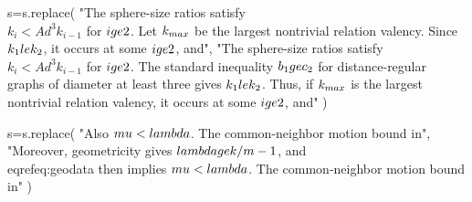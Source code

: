 s=s.replace(
"The sphere-size ratios satisfy\n\\[\n \\frac{k}{c_2}>\\frac{b_1}{c_2}=\\frac{k_2}{k_1}\n \\ge\\cdots\\ge\\frac{k_d}{k_{d-1}},\n\\]\nso $k_i<Ad^3k_{i-1}$ for $i\\ge2$. Let $k_{\\max}$ be the largest nontrivial relation valency. Since $k_1\\le k_2$, it occurs at some $i\\ge2$, and",
"The sphere-size ratios satisfy\n\\[\n Ad^3>\\frac{k}{c_2}>\\frac{b_1}{c_2}=\\frac{k_2}{k_1}\n \\ge\\cdots\\ge\\frac{k_d}{k_{d-1}},\n\\]\nso $k_i<Ad^3k_{i-1}$ for $i\\ge2$. The standard inequality $b_1\\ge c_2$ for distance-regular graphs of diameter at least three gives $k_1\\le k_2$. Thus, if $k_{\\max}$ is the largest nontrivial relation valency, it occurs at some $i\\ge2$, and"
)

s=s.replace(
"Also $\\mu<\\lambda$. The common-neighbor motion bound in",
"Moreover, geometricity gives $\\lambda\\ge k/m-1$, and \\eqref{eq:geodata} then implies $\\mu<\\lambda$. The common-neighbor motion bound in"
)

